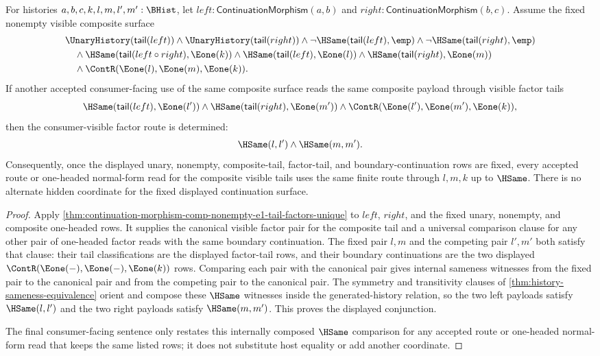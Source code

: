 \begin{corollary}
\label{cor:continuation-morphism-composite-visible-tails-consumer-determinacy}
For histories $a,b,c,k,l,m,l',m':\BHist$, let
$left:\mathsf{ContinuationMorphism}(a,b)$ and
$right:\mathsf{ContinuationMorphism}(b,c)$. Assume the fixed nonempty visible
composite surface
$$
\begin{aligned}
&\UnaryHistory(\mathsf{tail}(left))\land
\UnaryHistory(\mathsf{tail}(right))\land
\neg\HSame(\mathsf{tail}(left),\emp)\land
\neg\HSame(\mathsf{tail}(right),\emp) \\
&\quad\land\HSame(\mathsf{tail}(left\circ right),\Eone(k))\land
\HSame(\mathsf{tail}(left),\Eone(l))\land
\HSame(\mathsf{tail}(right),\Eone(m)) \\
&\quad\land\ContR(\Eone(l),\Eone(m),\Eone(k)).
\end{aligned}
$$
If another accepted consumer-facing use of the same composite surface reads the
same composite payload through visible factor tails
$$
\HSame(\mathsf{tail}(left),\Eone(l'))\land
\HSame(\mathsf{tail}(right),\Eone(m'))\land
\ContR(\Eone(l'),\Eone(m'),\Eone(k)),
$$
then the consumer-visible factor route is determined:
$$
\HSame(l,l')\land\HSame(m,m').
$$
Consequently, once the displayed unary, nonempty, composite-tail, factor-tail,
and boundary-continuation rows are fixed, every accepted route or one-headed
normal-form read for the composite visible tails uses the same finite route
through $l,m,k$ up to $\HSame$. There is no alternate hidden coordinate for the
fixed displayed continuation surface.
\end{corollary}
\begin{proof}
Apply
\autoref{thm:continuation-morphism-comp-nonempty-e1-tail-factors-unique} to
$left$, $right$, and the fixed unary, nonempty, and composite one-headed rows.
It supplies the canonical visible factor pair for the composite tail and a
universal comparison clause for any other pair of one-headed factor reads with
the same boundary continuation. The fixed pair $l,m$ and the competing pair
$l',m'$ both satisfy that clause: their tail classifications are the displayed
factor-tail rows, and their boundary continuations are the two displayed
$\ContR(\Eone(-),\Eone(-),\Eone(k))$ rows. Comparing each pair with the
canonical pair gives internal sameness witnesses from the fixed pair to the
canonical pair and from the competing pair to the canonical pair. The symmetry
and transitivity clauses of \autoref{thm:history-sameness-equivalence} orient
and compose these $\HSame$ witnesses inside the generated-history relation, so
the two left payloads satisfy $\HSame(l,l')$ and the two right payloads satisfy
$\HSame(m,m')$. This proves the displayed conjunction.

The final consumer-facing sentence only restates this internally composed
$\HSame$ comparison for any accepted route or one-headed normal-form read that
keeps the same listed rows; it does not substitute host equality or add another
coordinate.
\end{proof}
